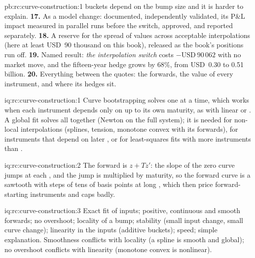 \begin{solution}{pb:rc:curve-construction:1}
buckets depend on the bump size and it is harder to explain.
\textbf{17.} As a model change: documented, independently validated, its P\&L
impact measured in parallel runs before the switch, approved, and reported
separately.
\textbf{18.} A reserve for the spread of values across acceptable
interpolations (here at least USD~90 thousand on this book), released as the
book's  positions run off.
\textbf{19.} Named result: \emph{the interpolation switch} costs
$-\text{USD}~90\,062$ with no market move, and the fifteen-year hedge grows by
68\%, from USD~0.30 to 0.51 billion.
\textbf{20.} Everything between the quotes: the forwards, the value of every
 instrument, and where its hedges sit.
\end{solution}

\begin{solution}{iq:rc:curve-construction:1}
Curve bootstrapping solves one  at a time, which works when each
instrument depends only on  up to its own maturity, as with linear or
. A global fit solves all  together (Newton
on the full system); it is needed for non-local interpolations (splines,
tension, monotone convex with its  forwards), for instruments that
depend on later , or for least-squares fits with more instruments than
.
\end{solution}

\begin{solution}{iq:rc:curve-construction:2}
The forward is $z+Tz'$: the slope of the zero curve jumps at each , and
the jump is multiplied by maturity, so the forward curve is a sawtooth with
steps of tens of basis points at long , which then price forward-starting
instruments and caps badly.
\end{solution}

\begin{solution}{iq:rc:curve-construction:3}
Exact fit of inputs; positive, continuous and smooth forwards; no overshoot;
locality of a bump; stability (small input change, small curve change);
linearity in the inputs (additive buckets); speed; simple explanation.
Smoothness conflicts with locality (a spline is smooth and global); no
overshoot conflicts with linearity (monotone convex is nonlinear).
\end{solution}

